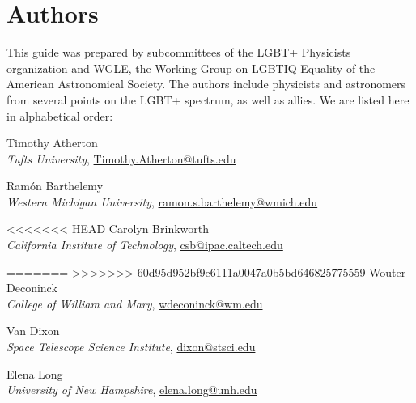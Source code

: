 %

\chapter{Authors}	%
\label{authors}		%
\normalsize			%

This guide was prepared by subcommittees of the LGBT+ Physicists organization and WGLE, the Working Group on LGBTIQ Equality of the American Astronomical Society. The authors include physicists and astronomers from several points on the LGBT+ spectrum, as well as allies. We are listed here in alphabetical order:


\vspace*{\baselineskip}

\noindent Timothy Atherton\\
\indent \emph{Tufts University}, \href{mailto:Timothy.Atherton@tufts.edu}{Timothy.Atherton@tufts.edu}\vspace*{\baselineskip}

\noindent Ram\'{o}n Barthelemy\\
\indent \emph{Western Michigan University}, \href{mailto:ramon.s.barthelemy@wmich.edu}{ramon.s.barthelemy@wmich.edu}\vspace*{\baselineskip}

<<<<<<< HEAD
\noindent Carolyn Brinkworth\\
\indent \emph{California Institute of Technology}, \href{mailto:csb@ipac.caltech.edu}{csb@ipac.caltech.edu}\vspace*{\baselineskip}

=======
>>>>>>> 60d95d952bf9e6111a0047a0b5bd646825775559
\noindent Wouter Deconinck\\
\indent \emph{College of William and Mary}, \href{mailto:wdeconinck@wm.edu}{wdeconinck@wm.edu}\vspace*{\baselineskip}

\noindent Van Dixon\\
\indent \emph{Space Telescope Science Institute}, \href{mailto:dixon@stsci.edu}{dixon@stsci.edu}\vspace*{\baselineskip}

\noindent Elena Long\\
\indent \emph{University of New Hampshire}, \href{mailto:elena.long@unh.edu}{elena.long@unh.edu}\vspace*{\baselineskip}

